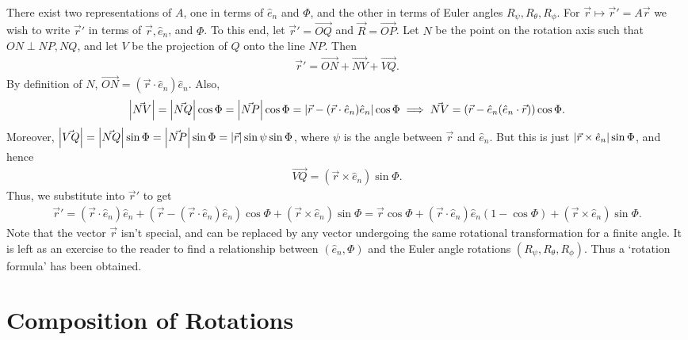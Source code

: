 There exist two representations of $A$, one in terms of $\hat{e}_{n}$ and $\Phi$, and the other in terms of Euler angles $R_{\psi},R_{\theta},R_{\phi}$. For $\vec{r} \mapsto \vec{r}' = A\vec{r}$ we wish to write $\vec{r}'$ in terms of $\vec{r},\hat{e}_{n}$, and $\Phi$. To this end, let $\vec{r}' = \vec{OQ}$ and $\vec{R} = \vec{OP}$. Let $N$ be the point on the rotation axis such that $ON \perp NP,NQ$, and let $V$ be the projection of $Q$ onto the line $NP$. Then
\begin{align}
    \vec{r}' = \vec{ON} + \vec{NV} + \vec{VQ}.
\end{align}
By definition of $N$, $\vec{ON} = (\vec{r} \cdot \hat{e}_{n}) \hat{e}_{n}$. Also,
\begin{align}
    \left| \vec{NV} \right| = \left| \vec{NQ} \right| \cos \Phi = \left| \vec{NP} \right| \cos \Phi = \left| \vec{r} - (\vec{r} \cdot \hat{e}_{n}) \hat{e}_{n} \right| \cos \Phi \implies \vec{NV} = (\vec{r} - \hat{e}_{n}(\hat{e}_{n} \cdot \vec{r})) \cos \Phi.
\end{align}
Moreover, $\left| \vec{VQ} \right| = \left| \vec{NQ} \right| \sin \Phi = \left| \vec{NP} \right| \sin \Phi = \left| \vec{r} \right| \sin \psi \sin \Phi$, where $\psi$ is the angle between $\vec{r}$ and $\hat{e}_{n}$. But this is just $\left| \vec{r} \times \hat{e}_{n} \right| \sin \Phi$, and hence 
\begin{align}
    \vec{VQ} = (\vec{r} \times \hat{e}_{n}) \sin \Phi.
\end{align}
Thus, we substitute into $\vec{r}'$ to get
\begin{align}
    \vec{r}' = (\vec{r} \cdot \hat{e}_{n}) \hat{e}_{n} + (\vec{r} - (\vec{r} \cdot \hat{e}_{n}) \hat{e}_{n}) \cos \Phi + (\vec{r} \times \hat{e}_{n}) \sin \Phi = \vec{r} \cos \Phi + (\vec{r} \cdot \hat{e}_{n}) \hat{e}_{n} ( 1-\cos\Phi) + (\vec{r} \times \hat{e}_{n}) \sin \Phi.
\end{align}
Note that the vector $\vec{r}$ isn't special, and can be replaced by any vector undergoing the same rotational transformation for a finite angle. It is left as an exercise to the reader to find a relationship between $(\hat{e}_{n},\Phi)$ and the Euler angle rotations $(R_{\psi},R_{\theta},R_{\phi})$. Thus a `rotation formula' has been obtained.

\section{Composition of Rotations}

